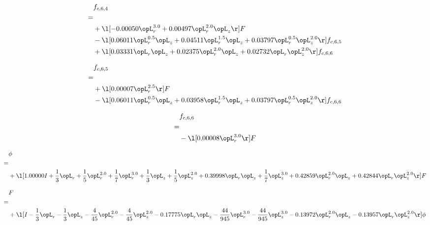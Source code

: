 \begin{alignat}{2} 
\label{eq:f_64_2} 
& f_{c,6,4} \nonumber \\ 
 = \\ 
& + \l[  -0.00050 \opL_r^{3.0} +  0.00497 \opL_r^{2.0} \opL_z  \r] F \nonumber \\ 
& - \l[  0.06011 \opL_r^{0.5} \opL_z +  0.04511 \opL_r^{1.5} \opL_z +  0.03797 \opL_r^{0.5} \opL_z^{2.0}  \r] f_{c,6,5} \nonumber \\ 
& + \l[  0.03331 \opL_r \opL_z +  0.02375 \opL_r^{2.0} \opL_z +  0.02732 \opL_r \opL_z^{2.0}  \r] f_{c,6,6} \nonumber \\ 
\end{alignat} 


\begin{alignat}{2} 
\label{eq:f_65_2} 
& f_{c,6,5} \nonumber \\ 
 = \\ 
& + \l[  0.00007 \opL_r^{2.5}  \r] F \nonumber \\ 
& - \l[  0.06011 \opL_r^{0.5} \opL_z +  0.03958 \opL_r^{1.5} \opL_z +  0.03797 \opL_r^{0.5} \opL_z^{2.0}  \r] f_{c,6,6} \nonumber \\ 
\end{alignat} 


\begin{alignat}{2} 
\label{eq:f_66_2} 
& f_{c,6,6} \nonumber \\ 
 = \\ 
& - \l[  0.00008 \opL_r^{3.0}  \r] F \nonumber \\ 
\end{alignat} 


\begin{alignat}{2} 
\label{eq:scalarFlux_1} 
& \phi \nonumber \\ 
 = \\ 
& + \l[  1.00000 I + \frac{1}{3} \opL_r + \frac{1}{5} \opL_r^{2.0} + \frac{1}{7} \opL_r^{3.0} + \frac{1}{3} \opL_z + \frac{1}{5} \opL_z^{2.0} +  0.39998 \opL_r \opL_z + \frac{1}{7} \opL_z^{3.0} +  0.42859 \opL_r^{2.0} \opL_z +  0.42844 \opL_r \opL_z^{2.0}  \r] F \nonumber \\ 
\end{alignat} 


\begin{alignat}{2} 
\label{eq:transport3D_0} 
& F \nonumber \\ 
 = \\ 
& + \l[ I - \frac{1}{3} \opL_r - \frac{1}{3} \opL_z - \frac{4}{45} \opL_r^{2.0} - \frac{4}{45} \opL_z^{2.0}   -0.17775 \opL_r \opL_z - \frac{44}{945} \opL_r^{3.0} - \frac{44}{945} \opL_z^{3.0}   -0.13972 \opL_r^{2.0} \opL_z   -0.13957 \opL_r \opL_z^{2.0}  \r] \phi \nonumber \\ 
\end{alignat} 


